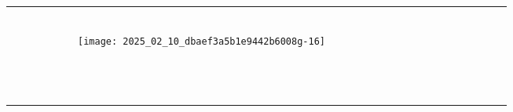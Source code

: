 \documentclass[10pt]{article}
\begin{document}
\begin{center}
\begin{tabular}{|c|c|c|c|c|c|c|c|c|c|c|c|c|c|c|c|c|c|c|c|c|c|c|}
\hline
 &  &  &  &  &  &  &  &  &  &  &  &  &  &  &  &  &  &  &  &  &  &  \\
\hline
 &  &  &  &  &  &  &  &  &  &  &  &  &  &  &  &  &  &  &  &  &  &  \\
\hline
 &  &  &  &  &  &  &  &  &  &  &  &  &  &  &  &  &  &  &  &  &  &  \\
\hline
 &  &  &  &  &  &  &  &  &  &  &  &  &  &  &  &  &  &  &  &  &  &  \\
\hline
 &  &  &  &  &  &  &  &  &  &  &  &  &  &  &  &  &  &  &  &  &  &  \\
\hline
 &  &  &  &  &  &  &  &  &  &  &  &  &  &  &  &  &  &  &  &  &  &  \\
\hline
 &  &  &  &  &  &  &  &  &  &  &  &  &  &  &  &  &  &  &  &  &  &  \\
\hline
 &  &  &  &  &  & \texttt{[image: 2025\_02\_10\_dbaef3a5b1e9442b6008g-16]}
 &  &  &  &  &  &  &  &  &  &  &  &  &  &  &  &  \\
\hline
 &  &  &  &  &  &  &  &  &  &  &  &  &  &  &  &  &  &  &  &  &  &  \\
\hline
 &  &  &  &  &  &  &  &  &  &  &  &  &  &  &  &  &  &  &  &  &  &  \\
\hline
 &  &  &  &  &  &  &  &  &  &  &  &  &  &  &  &  &  &  &  &  &  &  \\
\hline
 &  &  &  &  &  &  &  &  &  &  &  &  &  &  &  &  &  &  &  &  &  &  \\
\hline
 &  &  &  &  &  &  &  &  &  &  &  &  &  &  &  &  &  &  &  &  &  &  \\
\hline
 &  &  &  &  &  &  &  &  &  &  &  &  &  &  &  &  &  &  &  &  &  &  \\
\hline
 &  &  &  &  &  &  &  &  &  &  &  &  &  &  &  &  &  &  &  &  &  &  \\
\hline
 &  &  &  &  &  &  &  &  &  &  &  &  &  &  &  &  &  &  &  &  &  &  \\
\hline
 &  &  &  &  &  &  &  &  &  &  &  &  &  &  &  &  &  &  &  &  &  &  \\
\hline
 &  &  &  &  &  &  &  &  &  &  &  &  &  &  &  &  &  &  &  &  &  &  \\
\hline
 &  &  &  &  &  &  &  &  &  &  &  &  &  &  &  &  &  &  &  &  &  &  \\
\hline
 &  &  &  &  &  &  &  &  &  &  &  &  &  &  &  &  &  &  &  &  &  &  \\
\hline
 &  &  &  &  &  &  &  &  &  &  &  &  &  &  &  &  &  &  &  &  &  &  \\

\end{tabular}
\end{center}
\end{document}
